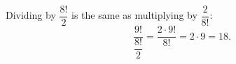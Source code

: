 Dividing by $\dfrac{8!}{2}$ is the same as multiplying by $\dfrac{2}{8!}$:
\[
\dfrac{9!}{\dfrac{8!}{2}}=\dfrac{2\cdot9!}{8!}=2\cdot9=\boxed{18}.
\]
